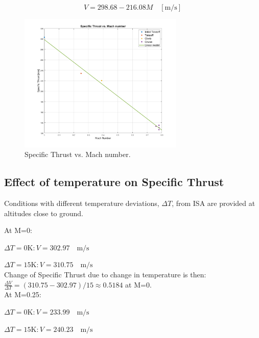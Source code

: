 \documentclass[english]{kththesis}
\begin{document}
\begin{equation}
\label{eq:SpecificThrust}
V = 298.68 - 216.08M \quad \mathrm{[m/s]}
\end{equation}


\begin{figure}[hb]
    \centering
    \includegraphics[width=0.7\textwidth]{Epictures/Specific Thrust vs. Mach number.png}
    \caption{Specific Thrust vs. Mach number.}
    \label{fig:STvsM}
\end{figure}

\clearpage

\subsection{Effect of temperature on Specific Thrust}

Conditions with different temperature deviations, $\Delta T$, from ISA are provided at altitudes close to ground.

At M=0:

$\Delta T=0 \mathrm{K}: V = 302.97 \quad\mathrm{m/s}$

$\Delta T=15 \mathrm{K}: V = 310.75 \quad\mathrm{m/s}$\\

Change of Specific Thrust due to change in temperature is then:\\

$\frac{\Delta V}{\Delta T} =  (310.75-302.97)/15 \approx 0.5184$ at   M=0.\\

At M=0.25:

$\Delta T=0 \mathrm{K}: V = 233.99 \quad\mathrm{m/s}$

$\Delta T=15 \mathrm{K}: V = 240.23 \quad\mathrm{m/s}$\\
\end{document}
